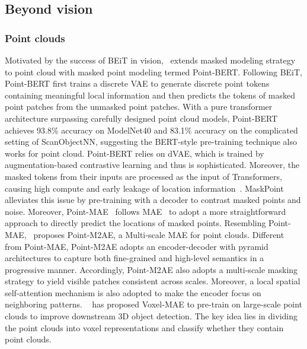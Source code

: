 \documentclass[10pt,journal,compsoc]{IEEEtran}
\begin{document}
\subsection{Beyond vision}


\subsubsection{Point clouds}
Motivated by the success of BEiT in vision,~\cite{yu2022point} extends masked modeling strategy to point cloud with masked point modeling termed Point-BERT. Following BEiT, Point-BERT first trains a discrete VAE to generate discrete point tokens containing meaningful local information and then predicts the tokens of masked point patches from the unmasked point patches. With a pure transformer architecture surpassing carefully designed point cloud models, Point-BERT achieves 93.8\% accuracy on ModelNet40 and 83.1\% accuracy on the complicated setting of ScanObjectNN, suggesting the BERT-style pre-training technique also works for point cloud. Point-BERT relies on dVAE, which is trained by augmentation-based contrastive learning and thus is sophisticated. Moreover, the masked tokens from their inputs are processed as the input of Transformers, causing high compute and early leakage of location information~\cite{pang2022masked}. MaskPoint~\cite{liu2022masked} alleviates this issue by pre-training with a decoder to contrast masked points and noise. Moreover, Point-MAE~\cite{pang2022masked} follows MAE~\cite{he2022masked} to adopt a more straightforward approach to directly predict the locations of masked points. Resembling Point-MAE,~\cite{zhang2022point} proposes Point-M2AE, a Multi-scale MAE for point clouds. Different from Point-MAE, Point-M2AE adopts an encoder-decoder with pyramid architectures to capture both fine-grained and high-level semantics in a progressive manner. Accordingly, Point-M2AE also adopts a multi-scale masking strategy to yield visible patches consistent across scales. Moreover, a local spatial self-attention mechanism is also adopted to make the encoder focus on neighboring patterns. ~\cite{min2022voxel} has proposed Voxel-MAE to pre-train on large-scale point clouds to improve downstream 3D object detection. The key idea lies in dividing the point
clouds into voxel representations and classify whether they contain point clouds.  
\end{document}
